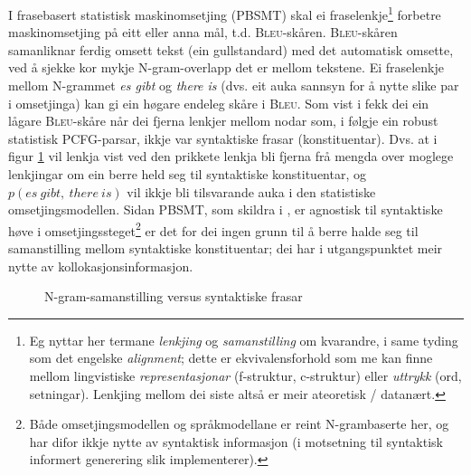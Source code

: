 \documentclass[11pt,a4paper,oneside,draft]{book}
\newcommand{\Bleu}{\textsc{Bleu}}
\begin{document}
I frasebasert statistisk maskinomsetjing (PBSMT) skal ei
fraselenkje\footnote{Eg nyttar her termane \emph{lenkjing} og \emph{samanstilling} om
 kvarandre, i same tyding som det engelske \emph{alignment}; dette er
 ekvivalensforhold som me kan finne mellom lingvistiske
 \emph{representasjonar} (f-struktur, c-struktur) eller \emph{uttrykk} (ord,
 setningar). Lenkjing mellom dei siste altså er meir ateoretisk / datanært. } forbetre maskinomsetjing på eitt eller anna mål,
t.d. \Bleu-skåren. \Bleu-skåren samanliknar ferdig
omsett tekst (ein gullstandard) med det automatisk omsette, ved å
sjekke kor mykje N-gram-overlapp det er mellom tekstene. Ei
fraselenkje mellom N-grammet \emph{es gibt} og \emph{there is} (dvs. eit auka
sannsyn for å nytte slike par i omsetjinga) kan gi ein høgare endeleg
skåre i \Bleu. Som vist i \citet{koehn2003spb} fekk dei ein
lågare \Bleu-skåre når dei fjerna lenkjer mellom nodar som, i
følgje ein robust statistisk PCFG-parsar, ikkje var syntaktiske frasar
(konstituentar). Dvs. at i figur \ref{fig:ikkjenode} vil lenkja vist
ved den prikkete lenkja bli fjerna frå mengda over moglege lenkjingar
om ein berre held seg til syntaktiske konstituentar, og
$p(es~gibt,~there~is)$ vil ikkje bli tilsvarande auka i den
statistiske omsetjingsmodellen. Sidan PBSMT, som skildra i
\citet{koehn2003spb}, er agnostisk til syntaktiske høve i
omsetjingssteget\footnote{Både omsetjingsmodellen og
språkmodellane er reint N-grambaserte her, og har difor ikkje nytte av
syntaktisk informasjon (i motsetning til syntaktisk informert
generering slik \citet{riezler2006gmt} implementerer). } er det for dei ingen grunn til å berre halde
seg til samanstilling mellom syntaktiske konstituentar; dei har i
utgangspunktet meir nytte av kollokasjonsinformasjon.

  \begin{figure}[htp]
    \vfill{} %
   \caption{N-gram-samanstilling versus syntaktiske frasar}
    \label{fig:ikkjenode}
  \end{figure}
\end{document}
